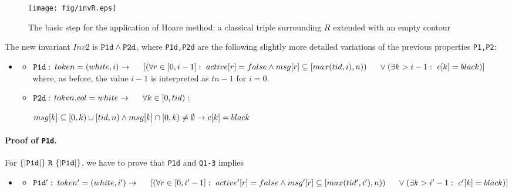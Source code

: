 \documentclass[runningheads]{llncs}
\newcommand{\1}{\u{a}}
\newcommand{\2}{\c{s}}
\newcommand{\5}{\c{t}}
\newcommand{\8}{\^{\i}}
\newcommand{\9}{\^{a}}
\newcommand{\bi}{\begin{itemize}}
\newcommand{\ei}{\end{itemize}}
\newcommand{\ra}{\rightarrow}
\newcommand{\co}{\,\colon\;}
\begin{document}
\begin{figure}[bh]\begin{center}\texttt{[image: fig/invR.eps]}\end{center}
\caption{The basic step for the application of Hoare method: a classical triple surrounding $R$ extended with
  an empty contour\vspace{-.3cm}}
\label{f-hoare-step}\end{figure}

The new invariant $Inv2$ is ${\tt P1d}\wedge {\tt P2d}$, where {\tt P1d,P2d} are the following slightly more
detailed variations of the previous properties {\tt P1,P2}:\bi\item[]\bi
\item[${\tt P1d:}$]$token=(white,i)\ra \\
\hspace*{.5cm}[(\forall r\in[0,i-1]\co active[r]=false\wedge msg[r]\subseteq[max(tid,i),n))\\
\hspace*{.5cm}\vee(\exists k>i-1\co c[k]=black)]$\\ where, as before, the value $i-1$ is interpreted as $tn-1$
for $i=0$.
\item[${\tt P2d:}$] $token.col=white\ra\\ \hspace*{.5cm}\forall k\in [0,tid)\co $\parbox[t]{8cm}{
$msg[k]\subseteq [0,k)\cup[tid,n) \wedge \\ msg[k]\cap[0,k)\not=\emptyset\ra c[k]=black$}\ei\ei

\paragraph{Proof of {\tt P1d}.} 

For $\{|{\tt P1d}|\}{\tt\ R\ }\{|{\tt P1d}|\}$, we have to prove that {\tt P1d} and {\tt Q1-3} implies
\bi\item[]\bi\item[${\tt P1d':}$]$token'=(white,i')\ra \\
\hspace*{.5cm}[(\forall r\in[0,i'-1]\co active'[r]=false\wedge msg'[r]\subseteq[max(tid',i'),n))\\
\hspace*{.5cm}\vee(\exists k>i'-1\co c'[k]=black)]$\ei\ei 
\end{document}
